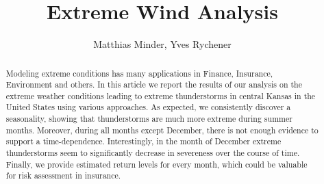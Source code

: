 \documentclass[10pt,conference,compsocconf]{IEEEtran}
\begin{document}
\title{Extreme Wind Analysis}

\author{
	Matthias Minder, Yves Rychener
}

\maketitle


\begin{abstract}
Modeling extreme conditions has many applications in Finance, Insurance, Environment and others. In this article we report the results of our analysis on the extreme weather conditions leading to extreme thunderstorms in central Kansas in the United States using various approaches. As expected, we consistently discover a seasonality, showing that thunderstorms are much more extreme during summer months. Moreover, during all months except December, there is not enough evidence to support a time-dependence. Interestingly, in the month of December extreme thunderstorms seem to significantly decrease in severeness over the course of time. Finally, we provide estimated return levels for every month, which could be valuable for risk assessment in insurance. 
\end{abstract}
\end{document}
